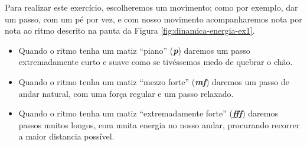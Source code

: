 \begin{example}
Para realizar este exercício, escolheremos um movimento; como por exemplo,
dar um passo, com um pé por vez, 
e com nosso movimento acompanharemos nota por nota 
ao ritmo descrito na pauta da Figura \ref{fig:dinamica-energia-ex1}.
\begin{itemize}
\item Quando o ritmo tenha um matiz ``piano'' (\textbf{\textit{p}}) 
daremos um passo extremadamente curto e suave como se tivéssemos medo de quebrar o chão.
\item Quando o ritmo tenha um matiz ``mezzo forte'' (\textbf{\textit{mf}}) 
daremos um passo de andar natural, com uma força regular e um passo relaxado. 
\item Quando o ritmo tenha um matiz ``extremadamente forte''  (\textbf{\textit{fff}}) 
daremos passos muitos longos, com muita energia no nosso andar, 
procurando recorrer a maior distancia possível.
\end{itemize}
\end{example}
